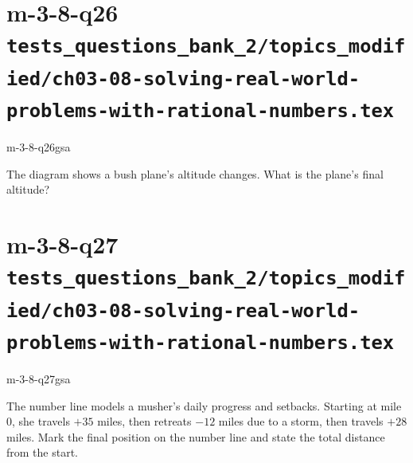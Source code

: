 \documentclass[12pt, fleqn, openany]{studyGuide}
\begin{document}
\section*{m-3-8-q26 \hfill \normalsize\texttt{tests\_questions\_bank\_2/topics\_modified/ch03-08-solving-real-world-problems-with-rational-numbers.tex}}
\begin{practiceQuestion}{m-3-8-q26}{gsa}
\begin{questionText}
The diagram shows a bush plane's altitude changes. What is the plane's final altitude?

\begin{center}
\end{center}
\end{questionText}
\end{practiceQuestion}

\newpage
\section*{m-3-8-q27 \hfill \normalsize\texttt{tests\_questions\_bank\_2/topics\_modified/ch03-08-solving-real-world-problems-with-rational-numbers.tex}}
\begin{practiceQuestion}{m-3-8-q27}{gsa}
\begin{questionText}
The number line models a musher's daily progress and setbacks. Starting at mile $0$, she travels $+35$ miles, then retreats $-12$ miles due to a storm, then travels $+28$ miles. Mark the final position on the number line and state the total distance from the start.

\begin{center}
\end{center}
\end{questionText}
\end{practiceQuestion}
\end{document}
